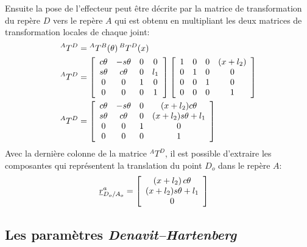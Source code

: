 \begin{example}
Ensuite la pose de l'effecteur peut être décrite par la matrice de transformation du repère $D$ vers le repère $A$ qui est obtenu en multipliant les deux matrices de transformation locales de chaque joint:
\begin{align}
{}^AT^D &=  {}^AT^B(\theta) \, {}^BT^D(x) \\
{}^AT^D &=  
\left[ \begin{array}{c c c c} 
  c\theta & -s\theta & 0 & 0  \\
	s\theta & c\theta  & 0 & l_1  \\
	0 & 0 & 1              & 0  \\ 
	0 & 0 & 0              & 1
\end{array} \right]
\left[ \begin{array}{c c c c} 
  1 & 0 & 0 & (x + l_2)  \\
	0 & 1 & 0 & 0  \\
	0 & 0 & 1 & 0  \\ 
	0 & 0 & 0 & 1
\end{array} \right] \\
{}^AT^D &=  
\left[ \begin{array}{c c c c} 
  c\theta & -s\theta & 0 & (x + l_2) c\theta  \\
	s\theta & c\theta  & 0 & (x + l_2) s\theta + l_1   \\
	0 & 0 & 1              & 0  \\ 
	0 & 0 & 0              & 1
\end{array} \right]
\end{align} 
Avec la dernière colonne de la matrice ${}^AT^D$, il est possible d'extraire les composantes qui représentent la translation du point $D_o$ dans le repère $A$:
\begin{align}
\underline{r}_{D_o/A_o}^a   &=  \left[ \begin{array}{c} 
( x + l_2 ) \, c\theta \\ ( x + l_2 ) s\theta  + l_1 \\ 0
\end{array} \right] 
\end{align} 

\end{example}

\newpage
\subsection{Les paramètres \textit{Denavit–Hartenberg}}

